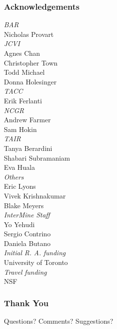 \documentclass{beamer}
\newcommand{\textemphb}[1]{\emph{\textcolor{beamerblue}{#1}}}
\begin{document}
\begin{frame}
    \frametitle{Acknowledgements}
        \begin{multicols}{3}
            \textemphb{BAR}\\
            Nicholas Provart\\
            \vspace{\baselineskip}
            \textemphb{JCVI}\\
            Agnes Chan\\
            Christopher Town\\
            Todd Michael\\
            Donna Holesinger\\
            \vspace{\baselineskip}
            \textemphb{TACC}\\
            Erik Ferlanti\\
            \vspace{\baselineskip}
            \textemphb{NCGR}\\
            Andrew Farmer\\
            Sam Hokin\\
            \vspace{\baselineskip}
            \textemphb{TAIR}\\
            Tanya Berardini\\
            Shabari Subramaniam\\
            Eva Huala\\
            \vspace{\baselineskip}
            \textemphb{Others}\\
            Eric Lyons\\
            Vivek Krishnakumar\\
            Blake Meyers\\
            \vspace{\baselineskip}
            \textemphb{InterMine Staff} \\
            Yo Yehudi\\
            Sergio Contrino\\
            Daniela Butano\\
            \vspace{\baselineskip}
            \textemphb{Initial R. A. funding}\\
            University of Toronto\\
            \vspace{\baselineskip}
            \textemphb{Travel funding}\\
            NSF\\
        \end{multicols}
\end{frame}

\begin{frame}
    \frametitle{Thank You}
    Questions? Comments? Suggestions?
\end{frame}
\end{document}
